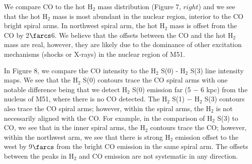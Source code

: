 \documentclass[manuscript]{aastex}
\begin{document}
We compare CO to the hot $\mathrm{H_2}$ mass distribution (Figure 7, $right$) and we see that the hot $\mathrm{H_2}$ mass is most abundant in the nuclear region, interior to the CO bright spiral arms.  In northwest spiral arm, the hot $\mathrm{H_2}$ mass is offset from the CO by 2$\farcs$6. We believe that the offsets between the CO  and the hot $\mathrm{H_2}$ mass are real, however, they are likely due to the dominance of other excitation mechanisms (shocks or X-rays) in the nuclear region of M51.


In Figure 8, we compare the CO intensity to the $\mathrm{H_2}$ S(0) - $\mathrm{H_2}$ S(3) line intensity maps.  We see that the $\mathrm{H_2}$ S(0) contours trace the CO spiral arms with one notable difference being that we detect $\mathrm{H_2}$ S(0) emission far (5 $-$ 6 kpc) from the nucleus of M51, where there is no CO detected.  The $\mathrm{H_2}$ S(1) $-$ $\mathrm{H_2}$ S(3) contours also trace the CO spiral arms; however, within the spiral arms, the $\mathrm{H_2}$ is not necessarily aligned with the CO.  For example, in the comparison of $\mathrm{H_2}$ S(3) to CO, we see that in the inner spiral arms, the $\mathrm{H_2}$ contours trace the CO; however, within the northwest arm, we see that there is strong $\mathrm{H_2}$ emission offset to the west by 9$\farcs$ from the bright CO emission in the same spiral arm.  The offsets between the peaks in $\mathrm{H_2}$ and CO emission are not systematic in any direction.
\end{document}
